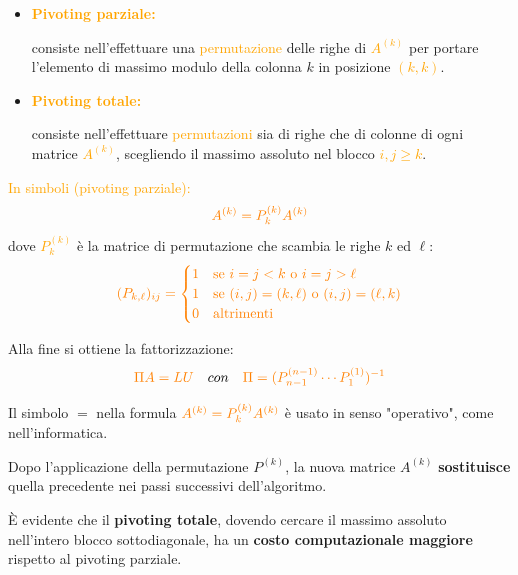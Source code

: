 \begin{defi}
    \label{def:pivoting_parziale}
    \begin{itemize}
        \item \textcolor{orange}{\textbf{Pivoting parziale:}}
        
        consiste nell'effettuare una \textcolor{orange}{permutazione} delle righe di \textcolor{orange}{$A^{(k)}$}
        per portare l'elemento di massimo modulo della colonna $k$ in posizione \textcolor{orange}{$(k,k)$}.\\[0.5em]   
        \item \textcolor{orange}{\textbf{Pivoting totale:}}
        
        consiste nell'effettuare \textcolor{orange}{permutazioni} sia di righe che di colonne
        di ogni matrice \textcolor{orange}{$A^{(k)}$}, scegliendo il massimo assoluto nel blocco \textcolor{orange}{$i,j \geq k$}.
    \end{itemize}
    
    \textcolor{orange}{In simboli (pivoting parziale):}
    \[
    \textcolor{orange}{A^{(k)} = P_k^{(k)} A^{(k)}}
    \]
    dove \textcolor{orange}{$P_k^{(k)}$} è la matrice di permutazione che scambia le righe $k$ ed $\ell$:
    \[
    \textcolor{orange}{(P_{k,\ell})_{ij} =
    \begin{cases}
        1 & \text{se } i = j < k \text{ o } i = j > \ell \\
        1 & \text{se } (i,j) = (k,\ell) \text{ o } (i,j) = (\ell,k) \\
        0 & \text{altrimenti}
    \end{cases}}
    \]
    
    Alla fine si ottiene la fattorizzazione:
    \[
    \textcolor{orange}{\Pi A = LU} \quad con \textcolor{orange}{ \quad 
    \Pi = (P_{n-1}^{(n-1)} \cdots P_1^{(1)})^{-1}}
    \]
\end{defi}

\begin{obs}
    Il simbolo $=$ nella formula  $\textcolor{orange}{A^{(k)} = P_k^{(k)} A^{(k)}}$ è usato in senso "operativo", come nell'informatica.

    Dopo l'applicazione della permutazione $P^{(k)}$, la nuova matrice $A^{(k)}$ \textbf{sostituisce} quella precedente nei passi successivi dell'algoritmo.
\end{obs}
È evidente che il \textbf{pivoting totale}, dovendo cercare il massimo assoluto nell'intero blocco sottodiagonale, ha un \textbf{costo computazionale maggiore} rispetto al pivoting parziale.

